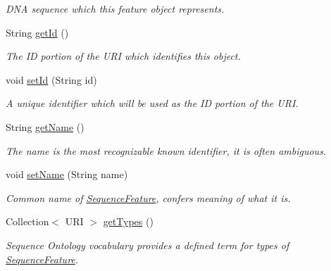 \begin{DoxyCompactItemize}
\begin{DoxyCompactList}\small\item\em DNA sequence which this feature object represents. \item\end{DoxyCompactList}\item 
String \hyperlink{classorg_1_1sbolstandard_1_1lib_s_b_o_lj_1_1_sequence_feature_a29ca06f6fde9a995e10bf2afd2a5d1db}{getId} ()
\begin{DoxyCompactList}\small\item\em The ID portion of the URI which identifies this object. \item\end{DoxyCompactList}\item 
void \hyperlink{classorg_1_1sbolstandard_1_1lib_s_b_o_lj_1_1_sequence_feature_a0e0068a7ce35f6b38c7a725fd4cabd3b}{setId} (String id)
\begin{DoxyCompactList}\small\item\em A unique identifier which will be used as the ID portion of the URI. \item\end{DoxyCompactList}\item 
String \hyperlink{classorg_1_1sbolstandard_1_1lib_s_b_o_lj_1_1_sequence_feature_ace428bc10a1bead3d0ae68d9ee926c78}{getName} ()
\begin{DoxyCompactList}\small\item\em The name is the most recognizable known identifier, it is often ambiguous. \item\end{DoxyCompactList}\item 
void \hyperlink{classorg_1_1sbolstandard_1_1lib_s_b_o_lj_1_1_sequence_feature_af407b7f97daa1f39f040acf4ac6c830c}{setName} (String name)
\begin{DoxyCompactList}\small\item\em Common name of \hyperlink{classorg_1_1sbolstandard_1_1lib_s_b_o_lj_1_1_sequence_feature}{SequenceFeature}, confers meaning of what it is. \item\end{DoxyCompactList}\item 
Collection$<$ URI $>$ \hyperlink{classorg_1_1sbolstandard_1_1lib_s_b_o_lj_1_1_sequence_feature_a75554518929bf85671383ac2c0839963}{getTypes} ()
\begin{DoxyCompactList}\small\item\em Sequence Ontology vocabulary provides a defined term for types of \hyperlink{classorg_1_1sbolstandard_1_1lib_s_b_o_lj_1_1_sequence_feature}{SequenceFeature}. \item\end{DoxyCompactList}\item 

\end{DoxyCompactItemize}

